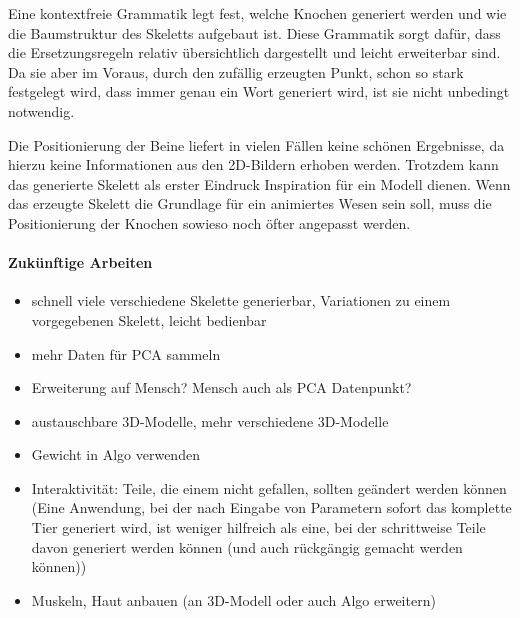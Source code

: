 Eine kontextfreie Grammatik legt fest, welche Knochen generiert werden und wie die Baumstruktur des Skeletts aufgebaut ist.
Diese Grammatik sorgt dafür, dass die Ersetzungsregeln relativ übersichtlich dargestellt und leicht erweiterbar sind. Da sie aber im Voraus, durch den zufällig erzeugten Punkt, schon so stark festgelegt wird, dass immer genau ein Wort generiert wird, ist sie nicht unbedingt notwendig.

Die Positionierung der Beine liefert in vielen Fällen keine schönen Ergebnisse, da hierzu keine Informationen aus den 2D-Bildern erhoben werden. Trotzdem kann das generierte Skelett als erster Eindruck \bzw Inspiration für ein Modell dienen. Wenn das erzeugte Skelett die Grundlage für ein animiertes Wesen sein soll, muss die Positionierung der Knochen sowieso noch öfter angepasst werden.


\paragraph{Zukünftige Arbeiten}





\begin{itemize}
 \item schnell viele verschiedene Skelette generierbar, Variationen zu einem vorgegebenen Skelett, leicht bedienbar

 \item mehr Daten für PCA sammeln
 \item Erweiterung auf Mensch? Mensch auch als PCA Datenpunkt?
 \item austauschbare 3D-Modelle,  mehr verschiedene 3D-Modelle
 \item Gewicht in Algo verwenden
 
 \item Interaktivität: Teile, die einem nicht gefallen, sollten geändert werden können (Eine Anwendung, bei der nach Eingabe von Parametern sofort das komplette Tier generiert wird, ist weniger hilfreich als eine, bei der schrittweise Teile davon generiert werden können (und auch rückgängig gemacht werden können))
 
 \item Muskeln, Haut \etc anbauen (an 3D-Modell oder auch Algo erweitern)
\end{itemize}


